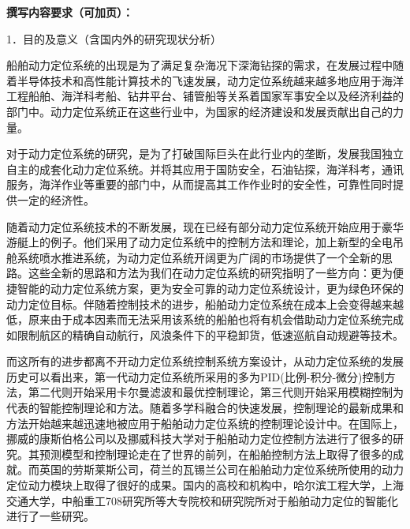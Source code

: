 \documentclass[a4paper]{ctexart}
\begin{document}
\pagebreak
\begin{mdframed}
{\large \textbf{\fangsong 撰写内容要求（可加页）：}}

{\large \fangsong 
\begin{flushleft}
1．目的及意义（含国内外的研究现状分析）
\end{flushleft}

   船舶动力定位系统的出现是为了满足复杂海况下深海钻探的需求，在发展过程中随着半导体技术和高性能计算技术的飞速发展，动力定位系统越来越多地应用于海洋工程船舶、海洋科考船、钻井平台、铺管船等关系着国家军事安全以及经济利益的部门中。动力定位系统正在这些行业中，为国家的经济建设和发展贡献出自己的力量。
   
对于动力定位系统的研究，是为了打破国际巨头在此行业内的垄断，发展我国独立自主的成套化动力定位系统。并将其应用于国防安全，石油钻探，海洋科考，通讯服务，海洋作业等重要的部门中，从而提高其工作作业时的安全性，可靠性同时提供一定的经济性。

随着动力定位系统技术的不断发展，现在已经有部分动力定位系统开始应用于豪华游艇上的例子。他们采用了动力定位系统中的控制方法和理论，加上新型的全电吊舱系统喷水推进系统，为动力定位系统开阔更为广阔的市场提供了一个全新的思路。这些全新的思路和方法为我们在动力定位系统的研究指明了一些方向：更为便捷智能的动力定位系统方案，更为安全可靠的动力定位系统设计，更为绿色环保的动力定位目标。伴随着控制技术的进步，船舶动力定位系统在成本上会变得越来越低，原来由于成本因素而无法采用该系统的船舶也将有机会借助动力定位系统完成如限制航区的精确自动航行，风浪条件下的平稳卸货，低速巡航自动规避等技术。

而这所有的进步都离不开动力定位系统控制系统方案设计，从动力定位系统的发展历史可以看出来，第一代动力定位系统所采用的多为PID(比例-积分-微分)控制方法，第二代则开始采用卡尔曼滤波和最优控制理论，第三代则开始采用模糊控制为代表的智能控制理论和方法。随着多学科融合的快速发展，控制理论的最新成果和方法开始越来越迅速地被应用于船舶动力定位系统的控制理论设计中。在国际上，挪威的康斯伯格公司以及挪威科技大学对于船舶动力定位控制方法进行了很多的研究。其预测模型和控制理论走在了世界的前列，在船舶控制方法上取得了很多的成就。而英国的劳斯莱斯公司，荷兰的瓦锡兰公司在船舶动力定位系统所使用的动力定位动力模块上取得了很好的成果。国内的高校和机构中，哈尔滨工程大学，上海交通大学，中船重工708研究所等大专院校和研究院所对于船舶动力定位的智能化进行了一些研究。

}
\end{mdframed}
\end{document}
